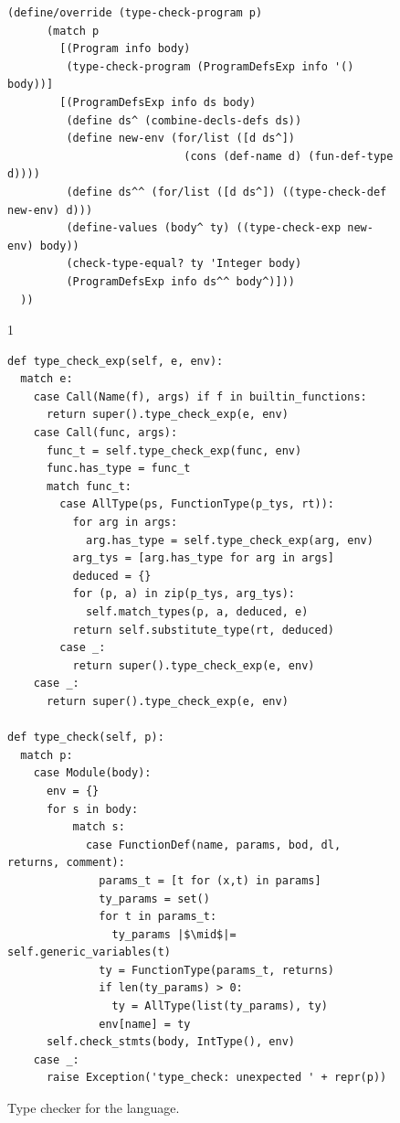 \documentclass[7x10]{TimesAPriori_MIT}%
\def\pythonEd{1}
\def\edition{1}
\newcommand{\pythonColor}[0]{}
\numberwithin{theorem}{chapter}
\numberwithin{definition}{chapter}
\numberwithin{equation}{chapter}
\begin{document}
\begin{figure}[tbp]
\begin{tcolorbox}[colback=white]
{\begin{lstlisting}[basicstyle=\ttfamily\scriptsize]
    (define/override (type-check-program p)
      (match p
        [(Program info body)
         (type-check-program (ProgramDefsExp info '() body))]
        [(ProgramDefsExp info ds body)
         (define ds^ (combine-decls-defs ds))
         (define new-env (for/list ([d ds^])
                           (cons (def-name d) (fun-def-type d))))
         (define ds^^ (for/list ([d ds^]) ((type-check-def new-env) d)))
         (define-values (body^ ty) ((type-check-exp new-env) body))
         (check-type-equal? ty 'Integer body)
         (ProgramDefsExp info ds^^ body^)]))
  ))
\end{lstlisting}
\fi}
{\if\edition\pythonEd\pythonColor
\begin{lstlisting}[basicstyle=\ttfamily\small]
def type_check_exp(self, e, env):
  match e:
    case Call(Name(f), args) if f in builtin_functions:
      return super().type_check_exp(e, env)      
    case Call(func, args):
      func_t = self.type_check_exp(func, env)
      func.has_type = func_t
      match func_t:
        case AllType(ps, FunctionType(p_tys, rt)):
          for arg in args:
            arg.has_type = self.type_check_exp(arg, env)
          arg_tys = [arg.has_type for arg in args]
          deduced = {}
          for (p, a) in zip(p_tys, arg_tys):
            self.match_types(p, a, deduced, e)
          return self.substitute_type(rt, deduced)
        case _:
          return super().type_check_exp(e, env)
    case _:
      return super().type_check_exp(e, env)

def type_check(self, p):
  match p:
    case Module(body):
      env = {}
      for s in body:
          match s:
            case FunctionDef(name, params, bod, dl, returns, comment):
              params_t = [t for (x,t) in params]
              ty_params = set()
              for t in params_t:
                ty_params |$\mid$|= self.generic_variables(t)
              ty = FunctionType(params_t, returns)
              if len(ty_params) > 0:
                ty = AllType(list(ty_params), ty)
              env[name] = ty
      self.check_stmts(body, IntType(), env)
    case _:
      raise Exception('type_check: unexpected ' + repr(p))
\end{lstlisting}
\fi}
\end{tcolorbox}

\caption{Type checker for the \LangPoly{} language.}
\label{fig:type-check-Lpoly}
\end{figure}
\end{document}
